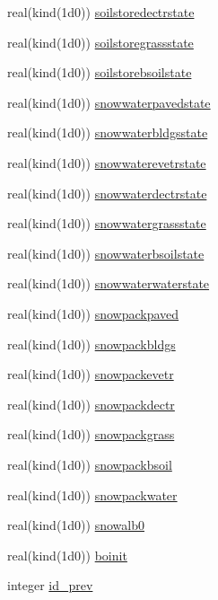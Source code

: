 \begin{DoxyCompactItemize}
real(kind(1d0)) \hyperlink{namespaceinitialcond_afeaa0ac5f4a21ca31fd443227c408360}{soilstoredectrstate}
\item 
real(kind(1d0)) \hyperlink{namespaceinitialcond_ac44c5ebd71aa0e5742ac992047c0ab9c}{soilstoregrassstate}
\item 
real(kind(1d0)) \hyperlink{namespaceinitialcond_a5d2a214e9dff8eb0fcb911d705d71684}{soilstorebsoilstate}
\item 
real(kind(1d0)) \hyperlink{namespaceinitialcond_af36f3c934c44327d689b18eb9026b813}{snowwaterpavedstate}
\item 
real(kind(1d0)) \hyperlink{namespaceinitialcond_afbba2830d10fca6c2e2a8ea93e8c9a38}{snowwaterbldgsstate}
\item 
real(kind(1d0)) \hyperlink{namespaceinitialcond_a276984b02077d85421623a51cf86ad6f}{snowwaterevetrstate}
\item 
real(kind(1d0)) \hyperlink{namespaceinitialcond_a65a1391e82bed313d590fb746fc28b09}{snowwaterdectrstate}
\item 
real(kind(1d0)) \hyperlink{namespaceinitialcond_a6fa88050456f833f1937cdc877b87605}{snowwatergrassstate}
\item 
real(kind(1d0)) \hyperlink{namespaceinitialcond_aa0f1d30ee29cd34825ab00ee65ea1739}{snowwaterbsoilstate}
\item 
real(kind(1d0)) \hyperlink{namespaceinitialcond_a665ef7ff3d3626422d630673de6c82cb}{snowwaterwaterstate}
\item 
real(kind(1d0)) \hyperlink{namespaceinitialcond_a032f3141b27c4888091a5d8ce505f6cb}{snowpackpaved}
\item 
real(kind(1d0)) \hyperlink{namespaceinitialcond_a9a868a739685083b0593be6dbe85a45e}{snowpackbldgs}
\item 
real(kind(1d0)) \hyperlink{namespaceinitialcond_a05602f6c4a611d494dd26c2f617307be}{snowpackevetr}
\item 
real(kind(1d0)) \hyperlink{namespaceinitialcond_ac930faf4b87e883e788bb46e4e495bdb}{snowpackdectr}
\item 
real(kind(1d0)) \hyperlink{namespaceinitialcond_a99c6060a146af926b3c850a3ff3e521d}{snowpackgrass}
\item 
real(kind(1d0)) \hyperlink{namespaceinitialcond_ab04d6bfb1300cff5f2870d1a66d86058}{snowpackbsoil}
\item 
real(kind(1d0)) \hyperlink{namespaceinitialcond_a392484bbee039fe1f1fcf3a3e972254d}{snowpackwater}
\item 
real(kind(1d0)) \hyperlink{namespaceinitialcond_a645991fe3858b2fa2ecc195ca83e624c}{snowalb0}
\item 
real(kind(1d0)) \hyperlink{namespaceinitialcond_a85ca43d1e5c8bfe458e5e9d0e806f672}{boinit}
\item 
integer \hyperlink{namespaceinitialcond_ab4535354b38e73f2157ff80353984f72}{id\+\_\+prev}
\end{DoxyCompactItemize}


